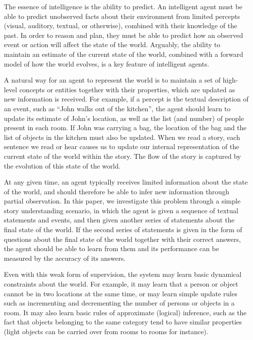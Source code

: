 \documentclass{article} \usepackage{iclr2016_conference,times}
\begin{document}
The essence of intelligence is the ability to predict.
An intelligent agent must be able to predict unobserved facts about their environment from limited percepts (visual, auditory, textual, or otherwise), combined with their knowledge of the past. 
In order to reason and plan, they must be able to predict how an observed event or action will affect the state of the world.
Arguably, the ability to maintain an estimate of the current state of the world, combined with a forward model of how the world evolves, is a key feature of intelligent agents.




A natural way for an agent to represent the world is to maintain a set of high-level concepts or entities together with their properties, which are updated as new information is received.
For example, if a percept is the textual description of an event, such
as ``John walks out of the kitchen'', the agent should learn to update
its estimate of John's location, as well as the list (and number) of
people present in each room.  If John was carrying a bag, the location
of the bag and the list of objects in the kitchen must also be
updated. When we read a story, each sentence we read or hear causes us
to update our internal representation of the current state of the
world within the story. The flow of the story is captured by the
evolution of this state of the world.

At any given time, an agent typically receives limited information about the state of the world, and should therefore be able to infer new information through partial observation. In this paper, we investigate this problem through a simple story understanding scenario, in which the agent is given a
sequence of textual statements and events, and then given another series of
statements about the final state of the world. If the second series of statements
is given in the form of questions about the final state of the
world together with their correct answers, the agent should be able to learn from them and its
performance can be measured by the accuracy of its
answers. 

Even with this weak form of supervision, the system may learn basic
dynamical constraints about the world.
For example, it may learn that a person or object cannot be in two locations at the same time, or may learn
simple update rules such as incrementing and decrementing the
number of persons or objects in a room. 
It may also learn basic rules of approximate (logical) inference, such as the fact that objects belonging to the same category tend to have similar properties (light objects can be carried over from rooms to rooms for instance).
\end{document}
